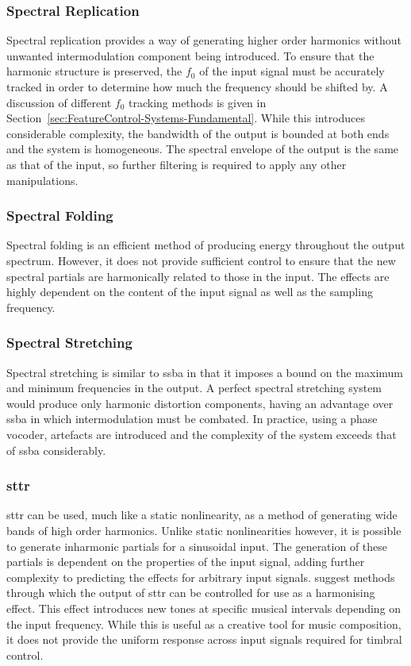 		\subsubsection*{Spectral Replication}
			Spectral replication provides a way of generating higher order harmonics without unwanted
			intermodulation component being introduced. To ensure that the harmonic structure is preserved, the
			$f_{0}$ of the input signal must be accurately tracked in order to determine how much the frequency
			should be shifted by. A discussion of different $f_{0}$ tracking methods is given in
			Section~\ref{sec:FeatureControl-Systems-Fundamental}. While this introduces considerable
			complexity, the bandwidth of the output is bounded at both ends and the system is homogeneous. The
			spectral envelope of the output is the same as that of the input, so further filtering is required
			to apply any other manipulations.

		\subsubsection*{Spectral Folding}
			Spectral folding is an efficient method of producing energy throughout the output spectrum.
			However, it does not provide sufficient control to ensure that the new spectral partials are
			harmonically related to those in the input. The effects are highly dependent on the content of the
			input signal as well as the sampling frequency.

		\subsubsection*{Spectral Stretching}
			Spectral stretching is similar to \acrshort{ssba} in that it imposes a bound on the maximum and
			minimum frequencies in the output. A perfect spectral stretching system would produce only harmonic
			distortion components, having an advantage over \acrshort{ssba} in which intermodulation must be
			combated. In practice, using a phase vocoder, artefacts are introduced and the complexity of the
			system exceeds that of \acrshort{ssba} considerably.

		\subsubsection*{\acrshort{sttr}}
			\acrshort{sttr} can be used, much like a static nonlinearity, as a method of generating wide bands
			of high order harmonics. Unlike static nonlinearities however, it is possible to generate
			inharmonic partials for a sinusoidal input. The generation of these partials is dependent on the
			properties of the input signal, adding further complexity to predicting the effects for arbitrary
			input signals.  \citet{kim2015harmonizing} suggest methods through which the output of
			\acrshort{sttr} can be controlled for use as a harmonising effect. This effect introduces new tones
			at specific musical intervals depending on the input frequency. While this is useful as a creative
			tool for music composition, it does not provide the uniform response across input signals required
			for timbral control.

